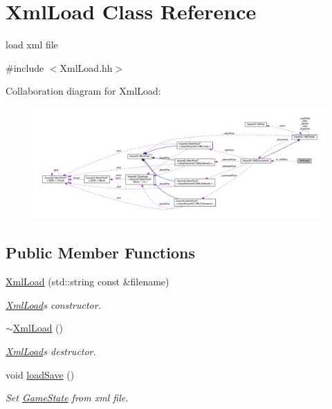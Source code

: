 \hypertarget{class_xml_load}{}\section{Xml\+Load Class Reference}
\label{class_xml_load}


load xml file  




{\ttfamily \#include $<$Xml\+Load.\+hh$>$}



Collaboration diagram for Xml\+Load\+:\nopagebreak
\begin{figure}[H]
\begin{center}
\leavevmode
\includegraphics[width=350pt]{class_xml_load__coll__graph}
\end{center}
\end{figure}
\subsection*{Public Member Functions}
\begin{DoxyCompactItemize}
\item 
\hyperlink{class_xml_load_aaf07a6622c712880f951c11c9f40c133}{Xml\+Load} (std\+::string const \&filename)
\begin{DoxyCompactList}\small\item\em \hyperlink{class_xml_load}{Xml\+Load}\textquotesingle{}s constructor. \end{DoxyCompactList}\item 
\hyperlink{class_xml_load_a95d063b80a1f7fa349787b1c1ca99f15}{$\sim$\+Xml\+Load} ()
\begin{DoxyCompactList}\small\item\em \hyperlink{class_xml_load}{Xml\+Load}\textquotesingle{}s destructor. \end{DoxyCompactList}\item 
void \hyperlink{class_xml_load_acf296045159ccecb13e4628bc5678295}{load\+Save} ()
\begin{DoxyCompactList}\small\item\em Set \hyperlink{class_game_state}{Game\+State} from xml file. \end{DoxyCompactList}\end{DoxyCompactItemize}
